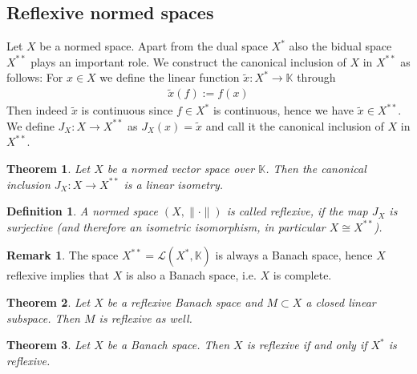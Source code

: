 \documentclass[11pt,a4paper]{article}
\newtheorem{thm}{Theorem}[section]
\newtheorem{defn}{Definition}[section]
\theoremstyle{definition}
\newtheorem{rem}{Remark}[section]
\begin{document}
\subsection{Reflexive normed spaces}
Let $X$ be a normed space. Apart from the dual space $X^*$ also the bidual space $X^{**}$ plays an important role. We construct the canonical inclusion of $X$ in $X^{**}$ as follows: For $x \in X$ we define the linear function $\tilde{x}:X^* \to \mathbb{K}$ through 
\begin{align*}
\tilde{x}(f):=f(x)
\end{align*}
Then indeed $\tilde{x}$ is continuous since $f \in X^*$ is continuous, hence we have $\tilde{x} \in X^{**}$. We define $J_X: X \to X^{**}$ as $J_X(x)= \tilde{x}$ and call it the canonical inclusion of $X$ in $X^{**}$. 
\begin{thm} Let $X$ be a normed vector space over $\mathbb{K}$. Then the canonical inclusion $J_X:X \to X^{**}$ is a linear isometry. 
\end{thm} 
\begin{defn} A normed space $(X, \| \cdot \|)$ is called reflexive, if the map $J_X$ is surjective (and therefore an isometric isomorphism, in particular $X \cong X^{**}$).
\end{defn}
\begin{rem} The space $X^{**}= \mathcal{L}(X^*, \mathbb{K})$ is always a Banach space, hence $X$ reflexive implies that $X$ is also a Banach space, i.e. $X$ is complete. 
\end{rem}
\begin{thm} Let $X$ be a reflexive Banach space and $M \subset X$ a closed linear subspace. Then $M$ is reflexive as well. 
\end{thm}
\begin{thm} Let $X$ be a Banach space. Then $X$ is reflexive if and only if $X^*$ is reflexive. 
\end{thm}
\end{document}
